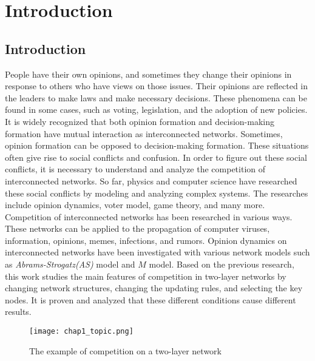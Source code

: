 
\chapter{Introduction}
\label{chap1}
\section{Introduction}
People have their own opinions, and sometimes they change their opinions in response to others who have views on those issues. Their opinions are reflected in the leaders to make laws and make necessary decisions. These phenomena can be found in some cases, such as voting, legislation, and the adoption of new policies. It is widely recognized that both opinion formation and decision-making formation have mutual interaction as interconnected networks\parencite{mikko2014, danziger2019, newman2010, boccaletti2014, domenico2013, tomasini2015, namkhanhvu2017}. Sometimes, opinion formation can be opposed to decision-making formation. These situations often give rise to social conflicts and confusion. In order to figure out these social conflicts, it is necessary to understand and analyze the competition of interconnected networks. So far, physics and computer science have researched these social conflicts by modeling and analyzing complex systems\parencite{fangwu2004, zuev2012, laguna2004, masuda2014}. The researches include opinion dynamics\parencite{amato2017, haibo2017, amato2017, quattrociocchi2014}, voter model\parencite{redner2005, casey2009}, game theory\parencite{smyrnakis2019}, and many more\parencite{bianconi2018}. 
Competition of interconnected networks has been researched in various ways. These networks can be applied to the propagation of computer viruses\parencite{serazzi2003}, information\parencite{hua2014}, opinions\parencite{alvarez2016, gomez2015,diep2017,rocca2014, velasquez2018}, memes\parencite{massad2013}, infections\parencite{shenyu2018, zhou2018}, and rumors\parencite{liu2018}. Opinion dynamics on interconnected networks have been investigated with various network models such as \textit{Abrams-Strogatz(AS)} model\parencite{abrams2003,vazquez2010} and $M$ model\parencite{rocca2014}.  Based on the previous research, this work studies the main features of competition in two-layer networks by changing network structures, changing the updating rules, and selecting the key nodes. It is proven and analyzed that these different conditions cause different results.
\begin{figure}[!htb]
	\centering
	\texttt{[image: chap1\_topic.png]}
	\caption{The example of competition on a two-layer network}
	\label{chap1_topic}
\end{figure}


